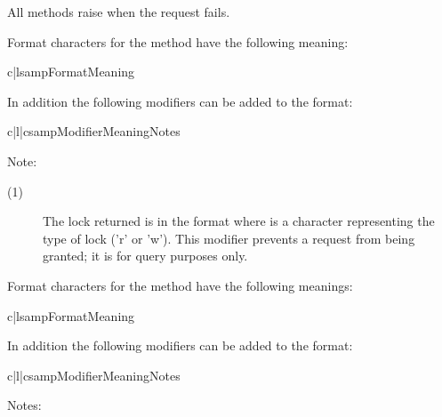 All methods raise  when the request fails.

Format characters for the  method have the following
meaning:

\begin{tableii}{c|l}{samp}{Format}{Meaning}
\end{tableii}

In addition the following modifiers can be added to the format:

\begin{tableiii}{c|l|c}{samp}{Modifier}{Meaning}{Notes}
\end{tableiii}

\noindent
Note:

\begin{description}
\item[(1)] The lock returned is in the format  where  is a character
representing the type of lock ('r' or 'w').  This modifier prevents a
request from being granted; it is for query purposes only.
\end{description}

Format characters for the  method have the following
meanings:

\begin{tableii}{c|l}{samp}{Format}{Meaning}
\end{tableii}

In addition the following modifiers can be added to the format:

\begin{tableiii}{c|l|c}{samp}{Modifier}{Meaning}{Notes}
\end{tableiii}

\noindent
Notes:

